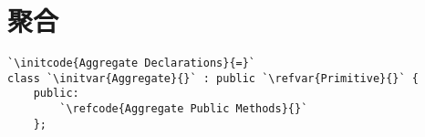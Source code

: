 \section{聚合}\label{sec:聚合}

\begin{lstlisting}
`\initcode{Aggregate Declarations}{=}`
class `\initvar{Aggregate}{}` : public `\refvar{Primitive}{}` {
    public:
        `\refcode{Aggregate Public Methods}{}`
    };
\end{lstlisting}